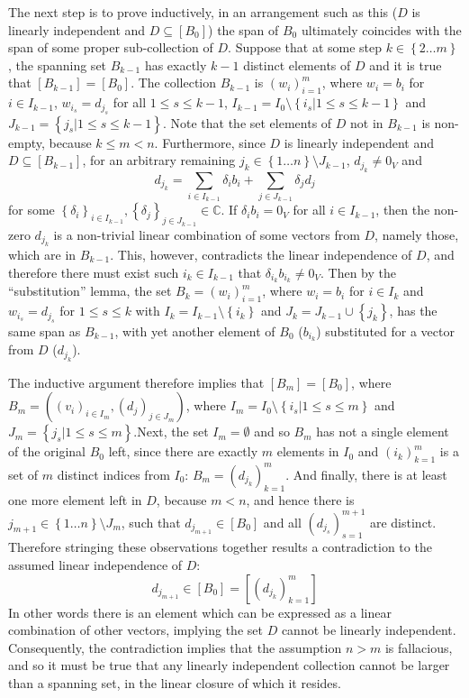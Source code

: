 \documentclass[a4paper]{article}
\newcommand{\obj}[1]{\ensuremath{\left\{ #1 \right\}}}
\newcommand{\brac}[1]{\ensuremath{\left( #1 \right)}}
\newcommand{\spn}[1]{\ensuremath{\left[ #1 \right]}}
\begin{document}
The next step is to prove inductively, in an arrangement such as this ($D$ is linearly independent and $D\subseteq \spn{B_0}$) the span of $B_0$ ultimately coincides with the span of some proper sub-collection of $D$. Suppose that at some step $k\in \obj{2\ldots m}$, the spanning set $B_{k-1}$ has exactly $k-1$ distinct elements of $D$ and it is true that $\spn{B_{k-1}} = \spn{B_0}$. The collection $B_{k-1}$ is $\brac{w_i}_{i=1}^m$, where $w_i=b_i$ for $i\in I_{k-1}$, $w_{i_s}=d_{j_s}$ for all $1\leq s\leq k-1$, $I_{k-1} = I_0\setminus \obj{i_s\vert 1\leq s\leq k-1}$ and $J_{k-1} = \obj{j_s\vert 1\leq s\leq k-1}$.
Note that the set elements of $D$ not in $B_{k-1}$ is non-empty, because $k\leq m < n$. Furthermore, since $D$ is linearly independent and $D\subseteq \spn{B_{k-1}}$, for an arbitrary remaining $j_k\in \obj{1\ldots n}\setminus J_{k-1}$, $d_{j_k}\neq 0_V$ and \[d_{j_k} = \sum_{i\in I_{k-1}} \delta_i b_i + \sum_{j\in J_{k-1}} \delta_j d_j\] for some $\obj{\delta_i}_{i\in I_{k-1}}, \obj{\delta_j}_{j\in J_{k-1}} \in \mathbb{C}$.
If $\delta_i b_i = 0_V$ for all $i\in I_{k-1}$, then the non-zero $d_{j_k}$ is a non-trivial linear combination of some vectors from $D$, namely those, which are in $B_{k-1}$. This, however, contradicts the linear independence of $D$, and therefore there must exist such $i_k\in I_{k-1}$ that $\delta_{i_k} b_{i_k} \neq 0_V$. Then by the ``substitution'' lemma, the set $B_k = \brac{w_i}_{i=1}^m$, where $w_i=b_i$ for $i\in I_k$ and $w_{i_s}=d_{j_s}$ for $1\leq s\leq k$ with $I_k = I_{k-1}\setminus \obj{i_k}$ and $J_k = J_{k-1} \cup \obj{j_k}$, has the same span as $B_{k-1}$, with yet another element of $B_0$ ($b_{i_k}$) substituted for a vector from $D$ ($d_{j_k}$).

The inductive argument therefore implies that $\spn{B_m}=\spn{B_0}$, where $B_m = \brac{\brac{v_i}_{i\in I_m}, \brac{d_j}_{j\in J_m}}$, where $I_m = I_0\setminus \obj{i_s\vert 1\leq s\leq m}$ and $J_m = \obj{j_s\vert 1\leq s\leq m}$.Next, the set $I_m = \emptyset$ and so $B_m$ has not a single element of the original $B_0$ left, since there are exactly $m$ elements in $I_0$ and $\brac{i_k}_{k=1}^m$ is a set of $m$ distinct indices from $I_0$: $B_m = \brac{d_{j_k}}_{k=1}^m$.
And finally, there is at least one more element left in $D$, because $m<n$, and hence there is $j_{m+1}\in \obj{1\ldots n}\setminus J_m$, such that $d_{j_{m+1}}\in \spn{B_0}$ and all $\brac{d_{j_s}}_{s=1}^{m+1}$ are distinct.
Therefore stringing these observations together results a contradiction to the assumed linear independence of $D$:\[d_{j_{m+1}}\in \spn{B_0} = \spn{\brac{d_{j_k}}_{k=1}^m}\]
In other words there is an element which can be expressed as a linear combination of other vectors, implying the set $D$ cannot be linearly independent. Consequently, the contradiction implies that the assumption $n>m$ is fallacious, and so it must be true that any linearly independent collection cannot be larger than a spanning set, in the linear closure of which it resides.
\end{document}
